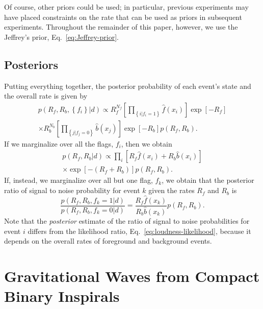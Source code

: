 \documentclass[aps,prd,reprint]{revtex4-1}
\begin{document}
Of course, other priors could be used; in particular, previous
experiments may have placed constraints on the rate that can be used
as priors in subsequent experiments.  Throughout the remainder of this
paper, however, we use the Jeffrey's prior,
Eq.~\eqref{eq:Jeffrey-prior}.

\subsection{Posteriors}

Putting everything together, the posterior probability of each event's
state and the overall rate is given by
\begin{multline}
  p(R_f, R_b, \left\{ f_i \right\} | d) \propto R_f^{N_f}
  \left[ \prod_{\left\{ i | f_i = 1 \right\}}
    \hat{f}\left( x_i \right) \right] \exp\left[ - R_f \right] \\
  \times R_b^{N_b} \left[ \prod_{\left\{ j | f_j = 0 \right\}}
    \hat{b}\left( x_j \right) \right] \exp\left[ - R_b \right] p(R_f, R_b).
\end{multline}
If we marginalize over all the flags, $f_i$, then we obtain
\begin{multline}
  \label{eq:rates-marginalized}
  p(R_f, R_b | d) \propto \prod_{i} \left[ R_f \hat{f}\left( x_i
    \right) + R_b \hat{b}\left( x_i \right) \right] \\ \times
  \exp\left[ - \left( R_f + R_b \right) \right] p\left( R_f, R_b
  \right).
\end{multline}
If, instead, we marginalize over all but one flag, $f_k$, we obtain
that the posterior ratio of signal to noise probability for event $k$
given the rates $R_f$ and $R_b$ is 
\begin{equation}
  \label{eq:foreground-marginalized}
  \frac{p(R_f, R_b, f_k = 1 | d)}{p(R_f, R_b, f_k = 0 | d)} =
  \frac{R_f \hat{f}\left( x_k \right)}{R_b \hat{b}\left( x_k
    \right)}p\left(R_f, R_b\right). 
\end{equation}
Note that the \emph{posterior} estimate of the ratio of signal to
noise probabilities for event $i$ differs from the likelihood ratio,
Eq.~\eqref{eq:loudness-likelihood}, because it depends on the overall
rates of foreground and background events.

\section{Gravitational Waves from Compact Binary Inspirals}
\label{sec:GW-example}
\end{document}
